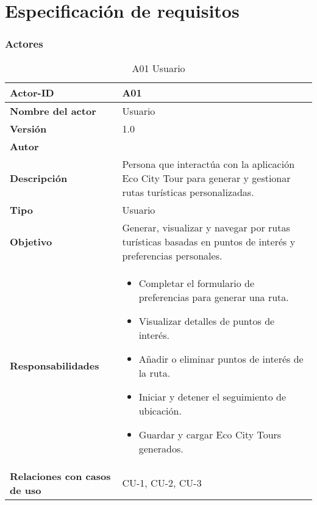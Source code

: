 \section{Especificación de requisitos}
\subsubsection{Actores}

\begin{table}[p]
	\centering
	\begin{tabularx}{\linewidth}{ p{} p{} }
		\toprule
		\textbf{Actor-ID}    & A01 \\
		\toprule
		\textbf{Nombre del actor} & Usuario \\
		\textbf{Versión}              & 1.0    \\
		\textbf{Autor}                & \autor \\
		\textbf{Descripción}          & Persona que interactúa con la aplicación Eco City Tour para generar y gestionar rutas turísticas personalizadas. \\
		\textbf{Tipo}                 & Usuario \\
		\textbf{Objetivo}             & Generar, visualizar y navegar por rutas turísticas basadas en puntos de interés y preferencias personales. \\
		\textbf{Responsabilidades}    & 
		\begin{itemize}
			\tightlist
			\item Completar el formulario de preferencias para generar una ruta.
			\item Visualizar detalles de puntos de interés.
			\item Añadir o eliminar puntos de interés de la ruta.
			\item Iniciar y detener el seguimiento de ubicación.
			\item Guardar y cargar Eco City Tours generados.
		\end{itemize}\\
		\textbf{Relaciones con casos de uso} & CU-1, CU-2, CU-3 \\
		\bottomrule
	\end{tabularx}
	\caption{A01 Usuario}
\end{table}

